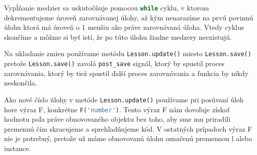 Vypĺňanie medzier sa uskutočňuje pomocou \lstinline[language=Python]{while} cyklu,
v ktorom dekrementujeme úroveň zarovnávanej úlohy, až kým nenarazíme na prvú povinnú úlohu ktorá má
úroveň o 1 menšiu ako práve zarovnávaná úloha. Vtedy cyklus skončíme a môžme si byť istí,
že po túto úlohu žiadne medzery neexistujú.

Na ukladanie zmien používame metódu \lstinline[language=Python]{Lesson.update()} miesto
\lstinline[language=Python]{Lesson.save()} pretože \lstinline[language=Python]{Lesson.save()} zavolá
\lstinline[language=Python]{post_save} signál, ktorý by spustil proces zarovnávania, ktorý by tiež
spustil ďalší proces zarovnávania a funkcia by nikdy neskončila.

Ako nové číslo úlohy v metóde \lstinline[language=Python]{Lesson.update()} používame pri posúvaní úloh hore výraz F,
konkrétne \lstinline[language=Python]{F('number')}. Tento výraz F nám dovoľuje získať hodnotu
poľa práve obnovovaného objektu bez toho, aby sme mu priradili premennú čím skracujeme
a sprehľadňujeme kód. V ostatných prípadoch výraz F nie je potrebný, pretože už máme
obnovovanú úlohu označenú premennou l alebo instance.
